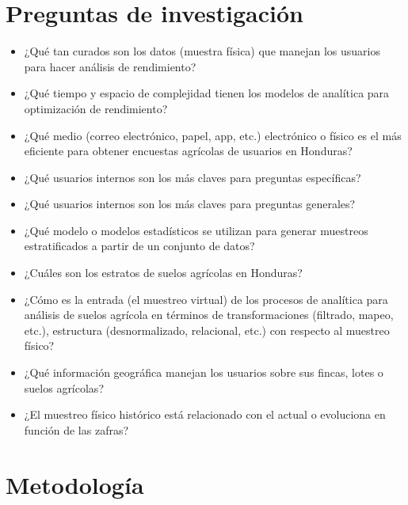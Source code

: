 \documentclass{report}
\begin{document}
\section{Preguntas de investigación}

\begin{itemize}
    \item ¿Qué tan curados son los datos (muestra física) que manejan los usuarios para hacer análisis de rendimiento?
    
    \item ¿Qué tiempo y espacio de complejidad tienen los modelos de analítica para optimización de rendimiento?
    
    \item ¿Qué medio (correo electrónico, papel, app, etc.) electrónico o físico es el más eficiente para obtener encuestas agrícolas de usuarios en Honduras?
    
    \item ¿Qué usuarios internos son los más claves para preguntas específicas?
    
    \item ¿Qué usuarios internos son los más claves para preguntas generales?
    
    \item ¿Qué modelo o modelos estadísticos se utilizan para generar muestreos estratificados a partir de un conjunto de datos?
    
    \item ¿Cuáles son los estratos de suelos agrícolas en Honduras?
    
    \item ¿Cómo es la entrada (el muestreo virtual) de los procesos de analítica para análisis de suelos agrícola en términos de transformaciones (filtrado, mapeo, etc.), estructura (desnormalizado, relacional, etc.) con respecto al muestreo físico?
    
    \item ¿Qué información geográfica manejan los usuarios sobre sus fincas, lotes o suelos agrícolas?
    
    \item ¿El muestreo físico histórico está relacionado con el actual o evoluciona en función de las zafras?
\end{itemize}


\section{Metodología}
\end{document}

